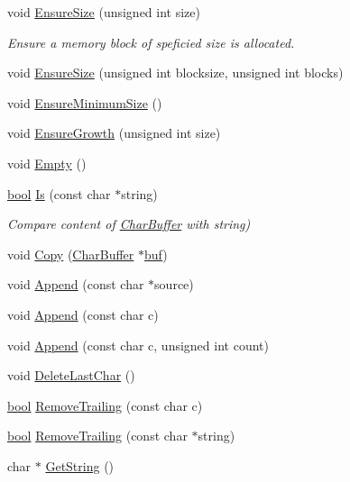 \begin{DoxyCompactItemize}
void \hyperlink{classCharBuffer_ad1907009b5ad136692b989fa96bf2f7e}{Ensure\+Size} (unsigned int size)
\begin{DoxyCompactList}\small\item\em Ensure a memory block of speficied size is allocated. \end{DoxyCompactList}\item 
void \hyperlink{classCharBuffer_a91ce4f4083b9a29c48f75e2af4071f28}{Ensure\+Size} (unsigned int blocksize, unsigned int blocks)
\item 
void \hyperlink{classCharBuffer_ae742439a2d5d5a0ad64411dcbf4604c8}{Ensure\+Minimum\+Size} ()
\item 
void \hyperlink{classCharBuffer_a73c71d361110b37819a1d681a1504b0e}{Ensure\+Growth} (unsigned int size)
\item 
void \hyperlink{classCharBuffer_abe39d3fd7d8b9c8ec343af2cae7adc96}{Empty} ()
\item 
\hyperlink{platform_8h_a1062901a7428fdd9c7f180f5e01ea056}{bool} \hyperlink{classCharBuffer_a64988275bda43dddb6d2b3b9551cefb0}{Is} (const char $\ast$string)
\begin{DoxyCompactList}\small\item\em Compare content of \hyperlink{classCharBuffer}{Char\+Buffer} with string) \end{DoxyCompactList}\item 
void \hyperlink{classCharBuffer_a9f35562a39a7785e73f09fbd9f6938bf}{Copy} (\hyperlink{classCharBuffer}{Char\+Buffer} $\ast$\hyperlink{classCharBuffer_a8bcd8491b24db4197b311eb361609674}{buf})
\item 
void \hyperlink{classCharBuffer_a045b38735f7b3007c1b98d3d7b7feafe}{Append} (const char $\ast$source)
\item 
void \hyperlink{classCharBuffer_a1ba545a85907bbc9ab26cdc99b031440}{Append} (const char c)
\item 
void \hyperlink{classCharBuffer_af0db379281b7f3f8b4746344521999c1}{Append} (const char c, unsigned int count)
\item 
void \hyperlink{classCharBuffer_a8bc0eaf1a874ccf76c0034299f8459a7}{Delete\+Last\+Char} ()
\item 
\hyperlink{platform_8h_a1062901a7428fdd9c7f180f5e01ea056}{bool} \hyperlink{classCharBuffer_a1071772d1059263f4f880965fcc349ab}{Remove\+Trailing} (const char c)
\item 
\hyperlink{platform_8h_a1062901a7428fdd9c7f180f5e01ea056}{bool} \hyperlink{classCharBuffer_a45beaedff09c0c079075cfced78c8002}{Remove\+Trailing} (const char $\ast$string)
\item 
char $\ast$ \hyperlink{classCharBuffer_a7dfd3feaaf80f318ba44efe15b1ec44b}{Get\+String} ()
\end{DoxyCompactItemize}
